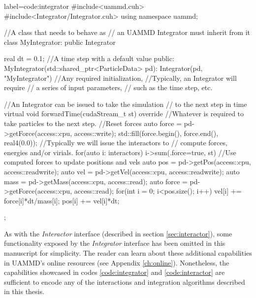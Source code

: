 \documentclass[twoside,openright,titlepage,numbers=noenddot,%
headinclude,footinclude,cleardoublepage=empty,abstract=on,
BCOR=5mm,fontsize=11pt, dvipsnames, paper=b5
]{scrreprt}
\newcommand{\uammd}{\gls{UAMMD}\xspace}
\begin{document}
\begin{code2}
{label=code:integrator}
#include<uammd.cuh>
#include<Integrator/Integrator.cuh>
using namespace uammd;

//A class that needs to behave as 
// an UAMMD Integrator must inherit from it
class MyIntegrator: public Integrator{
  real dt = 0.1; //A time step with a default value
public:
  MyIntegrator(std::shared_ptr<ParticleData> pd):
          Integrator(pd, "MyIntegrator"){
    //Any required initialization,
    //Typically, an Integrator will require
    // a series of input parameters,
    // such as the time step, etc.
  }

  //An Integrator can be issued to take the simulation
  // to the next step in time
  virtual void forwardTime(cudaStream_t st) override{
   //Whatever is required to take particles to the next step.
   { //Reset forces
     auto force = pd->getForce(access::cpu, access::write);
     std::fill(force.begin(), force.end(), real4(0.0));
   }
   //Typically we will issue the interactors to 
   // compute forces, energies and/or virials.
   for(auto i: interactors) i->sum({.force=true}, st)
   //Use computed forces to update positions and vels
   auto pos = pd->getPos(access::cpu, access::readwrite);
   auto vel = pd->getVel(access::cpu, access::readwrite);
   auto mass = pd->getMass(access::cpu, access::read);
   auto force = pd->getForce(access::cpu, access::read);
   for(int i = 0; i<pos.size(); i++){
     vel[i] += force[i]*dt/mass[i];
     pos[i] += vel[i]*dt;
   }
  }
};
\end{code2}

As with the \emph{Interactor} interface (described in section \ref{sec:interactor}), some functionality exposed by the \emph{Integrator} interface has been omitted in this manuscript for simplicity. The reader can learn about these additional capabilities in \uammd's online resources (see Appendix \ref{ch:online}). Nonetheless, the capabilities showcased in codes \ref{code:integrator} and \ref{code:interactor} are sufficient to encode any of the interactions and integration algorithms described in this thesis.
\end{document}
